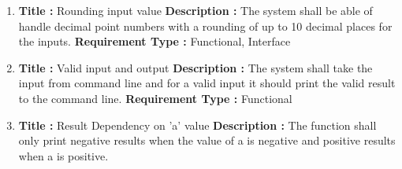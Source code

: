 \documentclass[a4paper, 11pt]{article}
\begin{document}
\begin{enumerate}
    \item \textbf{Title :} Rounding input value \newline 
    \textbf{Description : } The system shall be able of handle decimal point numbers with a rounding of up to 10 decimal places for the inputs. \newline
    \textbf{Requirement Type : } Functional, Interface
    
    \item \textbf{Title :} Valid input and output \newline
    \textbf{Description : } The system shall take the input from command line and for a valid input it should print the valid result to the command line.
    \newline
    \textbf{Requirement Type : } Functional
    
    \item \textbf{Title :} Result Dependency on 'a' value \newline 
    \textbf{Description : } The function shall only print negative results when the value of a is negative and positive results when a is positive.
    
\end{enumerate}
\end{document}
